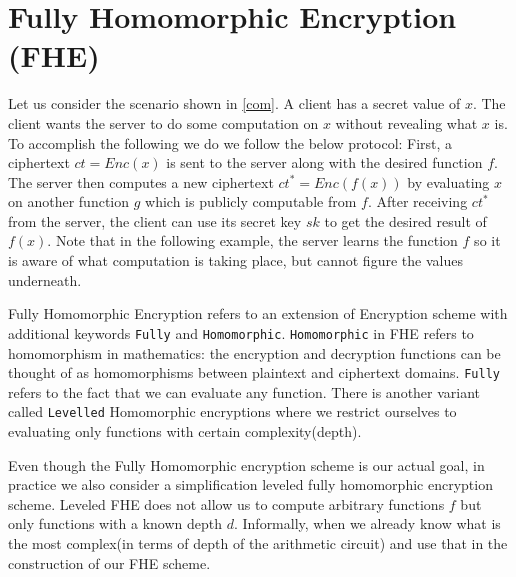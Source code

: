 \documentclass[usletter]{article}
\begin{document}
\section{Fully Homomorphic Encryption (FHE)}

Let us consider the scenario shown in \ref{com}. A client has a secret value of $x$. The client wants the server to do some computation on $x$ without revealing what $x$ is. To accomplish the following we do we follow the below protocol: First, a ciphertext $ct=Enc(x)$ is sent to the server along with the desired function $f$. The server then computes a new ciphertext $ct^*=Enc(f(x))$ by evaluating $x$ on another function $g$ which is publicly computable from $f$. After receiving $ct^*$ from the server, the client can use its secret key $sk$ to get the desired result of $f(x)$. Note that in the following example, the server learns the function $f$ so it is aware of what computation is taking place, but cannot figure the values underneath. 

Fully Homomorphic Encryption refers to an extension of Encryption scheme with additional keywords \texttt{Fully} and \texttt{Homomorphic}.
\texttt{Homomorphic} in FHE refers to homomorphism in mathematics: the encryption and decryption functions can be thought of as homomorphisms between plaintext and ciphertext domains. \texttt{Fully} refers to the fact that we can evaluate any function. There is another variant called \texttt{Levelled} Homomorphic encryptions where we restrict ourselves to evaluating only functions with certain complexity(depth). 

Even though the Fully Homomorphic encryption scheme is our actual goal, in practice we also consider a simplification leveled fully homomorphic encryption scheme. Leveled FHE does not allow us to compute arbitrary functions $f$ but only functions with a known depth $d$. Informally, when we already know what is the most complex(in terms of depth of the arithmetic circuit) and use that in the construction of our FHE scheme.
\end{document}
